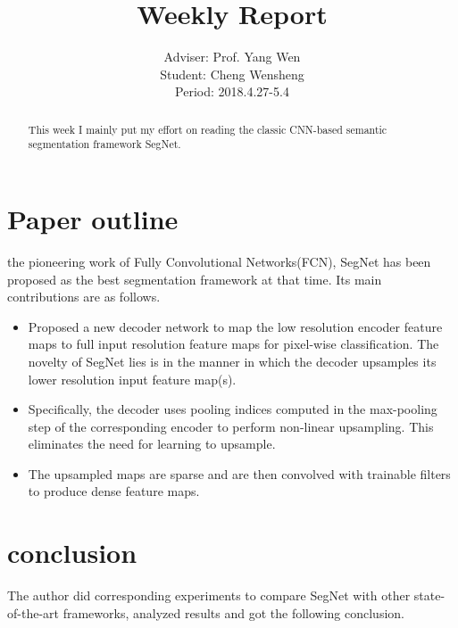 \documentclass[]{IEEEtran}
\begin{document}
	\title{Weekly Report}
	\author{Adviser: Prof. Yang Wen \\Student: Cheng Wensheng\\ Period: 2018.4.27-5.4
	}
	\maketitle

\begin{abstract}
	This week I mainly put my effort on reading the classic CNN-based semantic segmentation framework SegNet.
\end{abstract}

\section{Paper outline}
	 the pioneering work of Fully Convolutional Networks(FCN), SegNet has been proposed as the best segmentation framework at that time. Its main contributions are as follows.
	\begin{itemize}
		\item Proposed a new decoder network to map the low resolution encoder feature maps to full input resolution feature maps for pixel-wise classification. The novelty of SegNet lies is in the manner in which the decoder upsamples its lower resolution input feature map(s). 
		\item Specifically, the decoder uses pooling indices computed in the max-pooling step of the corresponding encoder to perform non-linear upsampling. This eliminates the need for learning to upsample.  
		\item The upsampled maps are sparse and are then
		convolved with trainable filters to produce dense feature maps.
	\end{itemize}

\section{conclusion}
	The author did corresponding experiments to compare SegNet with other state-of-the-art frameworks, analyzed results and got the following conclusion.
\end{document}
